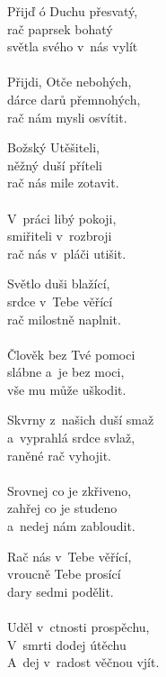 {
\setlength{\columnsep}{5pt}
\begin{translatioMulticol}{5}
Přijď ó Duchu přesvatý,\\
rač paprsek bohatý\\
světla svého v~nás vylít\\
\\
Přijdi, Otče nebohých,\\
dárce darů přemnohých,\\
rač nám mysli osvítit.\columnbreak

Božský Utěšiteli,\\
něžný duší příteli\\
rač nás mile zotavit.\\
\\
V~práci libý pokoji,\\
smiřiteli v~rozbroji\\
rač nás v~pláči utišit.\columnbreak

Světlo duši blažící,\\
srdce v~Tebe věřící\\
rač milostně naplnit.\\
\\
Člověk bez Tvé pomoci\\
slábne a~je bez moci,\\
vše mu může uškodit.\columnbreak

Skvrny z~našich duší smaž\\
a~vyprahlá srdce svlaž,\\
raněné rač vyhojit.\\
\\
Srovnej co je zkřiveno,\\
zahřej co je studeno\\
a~nedej nám zabloudit.\columnbreak

Rač nás v~Tebe věřící,\\
vroucně Tebe prosící\\
dary sedmi podělit.\\
\\
Uděl v~ctnosti prospěchu,\\
V~smrti dodej útěchu\\
A~dej v~radost věčnou vjít.
\end{translatioMulticol}
}
